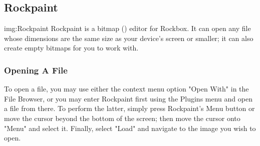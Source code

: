 \subsection{Rockpaint}
%
{img:Rockpaint}
Rockpaint is a bitmap () editor for Rockbox. It can open any  file
whose dimensions are the same size as your device's screen or smaller; it can
also create empty bitmaps for you to work with.\\

\subsubsection{Opening A File}
To open a file, you may use either the context menu option "Open With" in the
File Browser, or you may enter Rockpaint first using the Plugins menu and open
a file from there. To perform the latter, simply press Rockpaint's Menu button
or move the cursor beyond the bottom of the screen; then move the cursor onto
"Menu" and select it. Finally, select "Load" and navigate to the image you
wish to open.\\

